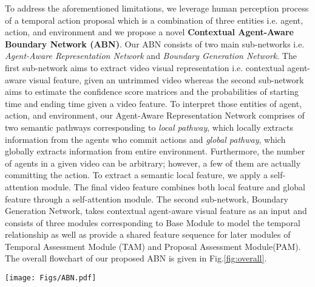 \documentclass{ieeeaccess}
\begin{document}
To address the aforementioned limitations, we leverage human perception process of a temporal action proposal which is a combination of three entities i.e.  agent, action, and environment and we propose a novel \textbf{Contextual Agent-Aware Boundary Network (ABN)}. Our ABN consists of two main sub-networks i.e. \textit{Agent-Aware Representation Network} and \textit{Boundary Generation Network}. The first sub-network aims to extract video visual representation i.e. contextual agent-aware visual feature, given an untrimmed video whereas the second sub-network aims to estimate the confidence score matrices and the probabilities of starting time and ending time given a video feature. To interpret those entities of agent, action, and environment, our Agent-Aware Representation Network comprises of two semantic pathways corresponding to \textit{local pathway}, which locally extracts information from the agents who commit actions and \textit{global pathway}, which globally extracts information from entire environment. Furthermore, the number of agents in a given video can be arbitrary; however, a few of them are actually committing the action. To extract a semantic local feature, we apply a self-attention module. The final video feature combines both local feature and global feature through a self-attention module. The second sub-network, Boundary Generation Network, takes contextual agent-aware visual feature as an input and consists of three modules corresponding to Base Module to model the temporal relationship as well as provide a shared feature sequence for later modules of Temporal Assessment Module (TAM) and Proposal Assessment Module(PAM). The overall flowchart of our proposed ABN is given in Fig.\mbox{\ref{fig:overall}}.


\begin{figure*}[ht]
  \begin{center}
    \texttt{[image: Figs/ABN.pdf]}
    \caption{An overview architecture for our proposed Contextual Agent-Aware Boundary Network (ABN) for TAPG. ABN consists of two main sub-networks i.e. \textit{Agent-Aware Representation Network} and \textit{Boundary Generation Network}.}
    \label{fig:overall}
  \end{center}
\end{figure*}
\end{document}
